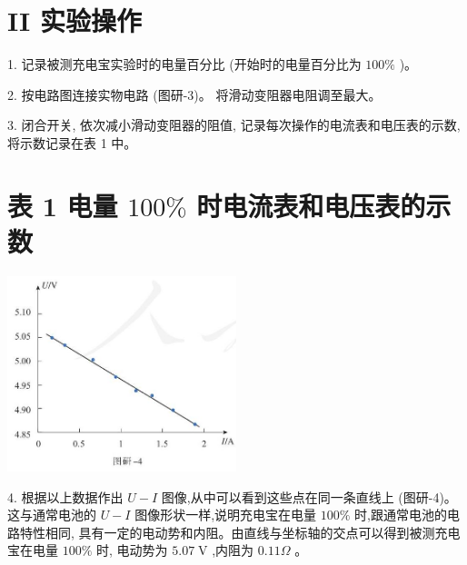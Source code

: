 \documentclass[10pt]{article}
\begin{document}
\section*{II 实验操作}

1. 记录被测充电宝实验时的电量百分比 (开始时的电量百分比为 \({100}\%\) )。

2. 按电路图连接实物电路 (图研-3)。 将滑动变阻器电阻调至最大。

3. 闭合开关, 依次减小滑动变阻器的阻值, 记录每次操作的电流表和电压表的示数, 将示数记录在表 1 中。

\section*{表 1 电量 \({100}\%\) 时电流表和电压表的示数}

\begin{center}
\end{center}

\begin{center}
\includegraphics[max width=0.5\textwidth]{images/01911d5f-8e38-70c0-b5b8-2b399bd115b6_137_347839.jpg}
\end{center}

4. 根据以上数据作出 \(U - I\) 图像,从中可以看到这些点在同一条直线上 (图研-4)。这与通常电池的 \(U - I\) 图像形状一样,说明充电宝在电量 \({100}\%\) 时,跟通常电池的电路特性相同, 具有一定的电动势和内阻。由直线与坐标轴的交点可以得到被测充电宝在电量 \({100}\%\) 时, 电动势为 \({5.07}\mathrm{\;V}\) ,内阻为 \({0.11\Omega }\) 。
\end{document}
